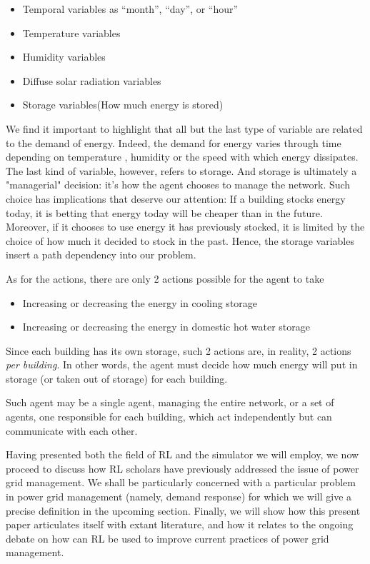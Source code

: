 \documentclass{article}
\begin{document}
\begin{itemize}
\item Temporal variables as “month”, “day”, or “hour”
\item Temperature variables
\item Humidity variables
\item Diffuse solar radiation variables
\item Storage variables(How much energy is stored)
\end{itemize}

We find it important to highlight that all but the last type of variable are related to the demand of energy. Indeed, the demand for energy varies through time depending on temperature , humidity or the speed with which energy dissipates. The last kind of variable, however, refers to storage. And storage is ultimately a "managerial" decision: it's how the agent chooses to manage the network. Such choice has implications that deserve our attention: If a building stocks energy today, it is betting that energy today will be cheaper than in the future. Moreover, if it chooses to use energy it has previously stocked, it is limited by the choice of how much it decided to stock in the past. Hence, the storage variables insert a path dependency into our problem.

As for the actions, there are only 2 actions possible for the agent to take

\begin{itemize}
\item Increasing or decreasing the energy in cooling storage
\item Increasing or decreasing the energy in domestic hot water storage
\end{itemize}

Since each building has its own storage, such 2 actions are, in reality, 2 actions \emph{per building}. In other words, the agent must decide how much energy will put in storage (or taken out of storage) for each building.

Such agent may be a single agent, managing the entire network, or a set of agents, one responsible for each building, which act independently but can communicate with each other.

Having presented both the field of RL and the simulator we will employ, we now proceed to discuss how RL scholars have previously addressed the issue of power grid management. We shall be particularly concerned with a particular problem in power grid management (namely, demand response) for which we will give a precise definition in the upcoming section. Finally, we will show how this present paper articulates itself with extant literature, and how it relates to the ongoing debate on how can RL be used to improve current practices of power grid management. 
\end{document}
